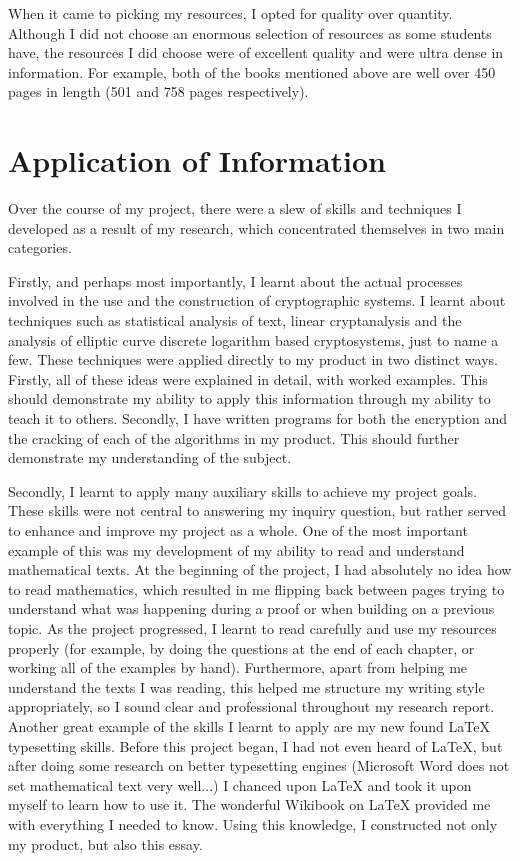 \documentclass[12pt, a4paper, final]{report}
\begin{document}
When it came to picking my resources, I opted for quality over quantity.
Although I did not choose an enormous selection of resources as some
students have, the resources I did choose were of excellent quality
and were ultra dense in information. For example, both of the books
mentioned above are well over 450 pages in length (501 and 758
pages respectively).

\section*{Application of Information}

Over the course of my project, there were a slew of skills and techniques
I developed as a result of my research, which concentrated themselves in
two main categories.

Firstly, and perhaps most importantly, I learnt about the actual processes
involved in the use and the construction of cryptographic systems. I
learnt about techniques such as statistical analysis of text, linear
cryptanalysis and the analysis of elliptic curve discrete logarithm based
cryptosystems, just to name a few. These techniques were applied directly
to my product in two distinct ways. Firstly, all of these ideas were explained in detail, with worked examples.
This should demonstrate my ability to apply this information through my
ability to teach it to others. Secondly, I have written programs for
both the encryption and the cracking of each of the algorithms in my
product. This should further demonstrate my understanding of the subject.

Secondly, I learnt to apply many auxiliary skills to achieve my project
goals. These skills were not central to answering my inquiry question, but
rather served to enhance and improve my project as a whole. One of the
most important example of this was my development of my ability to read
and understand mathematical texts. At the beginning of the project, I had
absolutely no idea how to read mathematics, which resulted in me flipping
back between pages trying to understand what was happening during a proof
or when building on a previous topic. As the project progressed, I learnt
to read carefully and use my resources properly (for example, by doing
the questions at the end of each chapter, or working all of the examples
by hand). Furthermore, apart from helping me understand the texts I was
reading, this helped me structure my writing style appropriately, so I
sound clear and professional throughout my research report. Another great
example of the skills I learnt to apply are my new found {\LaTeX} typesetting
skills. Before this project began, I had not even heard of {\LaTeX},
but after doing some research on better typesetting engines (Microsoft Word
does not set mathematical text very well...) I chanced upon {\LaTeX} and took
it upon myself to learn how to use it. The wonderful Wikibook on {\LaTeX}
provided me with everything I needed to know. Using this knowledge, I
constructed not only my product, but also this essay.
\end{document}
